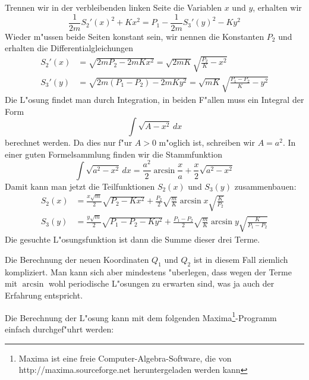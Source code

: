 {\begin{loesung}
Trennen wir in der verbleibenden linken Seite die Variablen $x$ und $y$,
erhalten wir
\[
\frac1{2m}S_2'(x)^2+Kx^2
=
P_1-
\frac1{2m}S_3'(y)^2-Ky^2
\]
Wieder m"ussen beide Seiten konstant sein, wir nennen die Konstanten $P_2$
und erhalten die Differentialgleichungen
\begin{align*}
S_2'(x)&=\sqrt{2mP_2-2mKx^2}=\sqrt{2mK}\sqrt{\frac{P_2}{K}-x^2}\\
S_3'(y)&=\sqrt{2m(P_1-P_2)-2mKy^2}=\sqrt{mK}\sqrt{\frac{P_1-P_2}{K}-y^2}
\end{align*}
Die L"osung findet man durch Integration, in beiden F"allen muss ein 
Integral der Form
\[
\int \sqrt{A-x^2}\,dx
\]
berechnet werden.
Da dies nur f"ur $A>0$ m"oglich ist, schreiben wir $A=a^2$.
In einer guten Formelsammlung finden wir die Stammfunktion
\[
\int\sqrt{a^2-x^2}\,dx
=
\frac{a^2}2\arcsin\frac{x}{a}+\frac{x}2\sqrt{a^2-x^2}
\]
Damit kann man jetzt die Teilfunktionen $S_2(x)$ und $S_3(y)$
zusammenbauen:
\begin{align*}
S_2(x)
&=
\frac{x\sqrt{m}}2\sqrt{P_2-Kx^2}
+
\frac{P_2}{2}\sqrt{\frac{m}{K}}\arcsin x\sqrt{\frac{K}{P_2}}
\\
S_3(y)
&=
\frac{y\sqrt{m}}2\sqrt{P_1-P_2-Ky^2}
+
\frac{P_1-P_2}2 \sqrt{\frac{m}{K}}\arcsin y\sqrt{\frac{K}{P_1-P_2}}
\end{align*}
Die gesuchte L"osungsfunktion ist dann die Summe dieser drei Terme.
\end{loesung}
}{}

Die Berechnung der neuen Koordinaten $Q_1$ und $Q_2$ ist in diesem
Fall ziemlich kompliziert. Man kann sich aber mindestens "uberlegen,
dass wegen der Terme mit $\arcsin$ wohl periodische L"osungen zu
erwarten sind, was ja auch der Erfahrung entspricht.

Die Berechnung der L"osung kann mit dem folgenden Maxima\footnote{Maxima
ist eine freie Computer-Algebra-Software, die von
http://maxima.sourceforge.net heruntergeladen werden kann}-Programm
einfach durchgef"uhrt werden:

